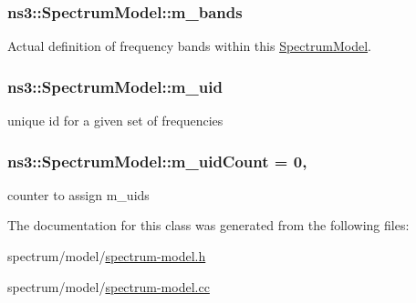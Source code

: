 \subsubsection[{\texorpdfstring{m\+\_\+bands}{m_bands}}]{ ns3\+::\+Spectrum\+Model\+::m\+\_\+bands\hspace{0.3cm}{\ttfamily [private]}}\hypertarget{classns3_1_1SpectrumModel_afb4f2240520efa617078b88c3959c532}{}\label{classns3_1_1SpectrumModel_afb4f2240520efa617078b88c3959c532}


Actual definition of frequency bands within this \hyperlink{classns3_1_1SpectrumModel}{Spectrum\+Model}. 

\subsubsection[{\texorpdfstring{m\+\_\+uid}{m_uid}}]{ ns3\+::\+Spectrum\+Model\+::m\+\_\+uid\hspace{0.3cm}{\ttfamily [private]}}\hypertarget{classns3_1_1SpectrumModel_a5220fa3bb9a94a50c6f1aa11fc65b76e}{}\label{classns3_1_1SpectrumModel_a5220fa3bb9a94a50c6f1aa11fc65b76e}


unique id for a given set of frequencies 

\subsubsection[{\texorpdfstring{m\+\_\+uid\+Count}{m_uidCount}}]{ ns3\+::\+Spectrum\+Model\+::m\+\_\+uid\+Count = 0\hspace{0.3cm}{\ttfamily [static]}, {\ttfamily [private]}}\hypertarget{classns3_1_1SpectrumModel_a25cd21aedfebec21bdee631bb0cebf58}{}\label{classns3_1_1SpectrumModel_a25cd21aedfebec21bdee631bb0cebf58}


counter to assign m\+\_\+uids 



The documentation for this class was generated from the following files\+:\begin{DoxyCompactItemize}
\item 
spectrum/model/\hyperlink{spectrum-model_8h}{spectrum-\/model.\+h}\item 
spectrum/model/\hyperlink{spectrum-model_8cc}{spectrum-\/model.\+cc}\end{DoxyCompactItemize}
